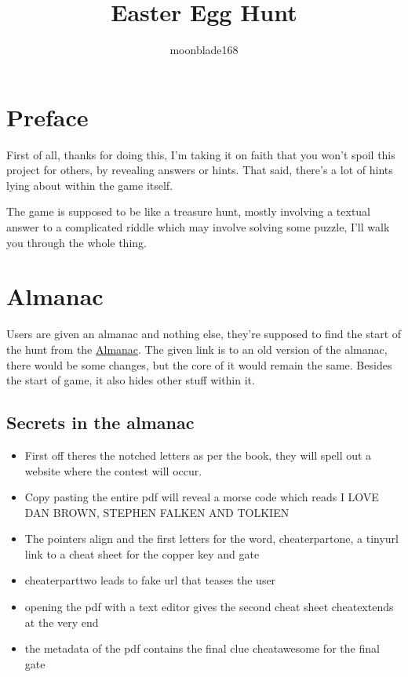 \documentclass[12pt]{article}
\title{Easter Egg Hunt}
\author{moonblade168}
\begin{document}
\maketitle

\section{Preface}
First of all, thanks for doing this, I'm taking it on faith that you won't spoil this project for others, by revealing answers or hints. That said, there's a lot of hints lying about within the game itself. 

The game is supposed to be like a treasure hunt, mostly involving a textual answer to a complicated riddle which may involve solving some puzzle, I'll walk you through the whole thing.

\section{Almanac}
Users are given an almanac and nothing else, they're supposed to find the start of the hunt from the \href{https://drive.google.com/file/d/0Bw1NE28SnI6_QWNuOEt2SExWUUk/view?usp=sharing}{Almanac}. The given link is to an old version of the almanac, there would be some changes, but the core of it would remain the same. Besides the start of game, it also hides other stuff within it.

\subsection{Secrets in the almanac}
\begin{itemize}
\item First off theres the notched letters as per the book, they will spell out a website where the contest will occur.
\item Copy pasting the entire pdf will reveal a morse code which reads I LOVE DAN BROWN, STEPHEN FALKEN AND TOLKIEN
\item The pointers align and the first letters for the word, cheaterpartone, a tinyurl link to a cheat sheet for the copper key and gate
\item cheaterparttwo leads to fake url that teases the user
\item opening the pdf with a text editor gives the second cheat sheet cheatextends at the very end
\item the metadata of the pdf contains the final clue cheatawesome for the final gate
\end{itemize}
\end{document}
